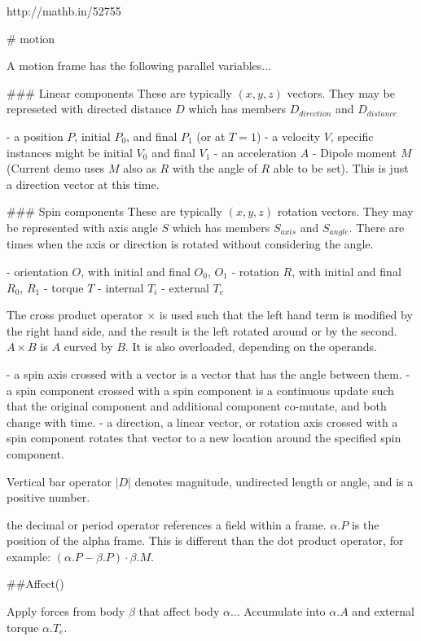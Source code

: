 
http://mathb.in/52755


# motion

A motion frame has the following parallel variables...

### Linear components
These are typically $(x,y,z)$ vectors.  They may be represeted with directed distance $D$ which has members $D_{direction}$ and $D_{distance}$

- a position $P$, initial $P_0$, and final $P_1$ (or at $T=1$)
- a velocity $V$, specific instances might be initial $V_0$ and final $V_1$
- an acceleration $A$
- Dipole moment $M$ (Current demo uses $M$ also as $R$ with the angle of $R$ able to be set).  This is just a direction vector at this time.
  
### Spin components 
These are typically $(x,y,z)$ rotation vectors.  They may be represented with axis angle $S$ which has members $S_{axis}$ and $S_{angle}$.  There are times when the axis or direction is rotated without considering the angle. 

- orientation $O$, with initial and final $O_0$, $O_1$
- rotation $R$, with initial and final $R_0$, $R_1$
- torque $T$
  - internal $T_i$
  - external $T_e$

The cross product operator $\times$ is used such that the left hand term is modified by the right hand side, and the result is the left rotated around or by the second.  $ A \times B $ is $A$ curved by $B$. It is also overloaded, depending on the operands.

- a spin axis crossed with a vector is a vector that has the angle between them.  
- a spin component crossed with a spin component is a continuous update such that the original component and additional component co-mutate, and both change with time.
- a direction, a linear vector, or rotation axis crossed with a spin component rotates that vector to a new location around the specified spin component.

Vertical bar operator $|D|$ denotes magnitude, undirected length or angle, and is a positive number.

the decimal or period operator references a field within a frame.  $\alpha.P$ is the position of the alpha frame. This is different than the dot product operator, for example: $(\alpha.P - \beta.P) \cdot \beta.M$.

##Affect()

Apply forces from body $\beta$ that affect body $\alpha$... Accumulate into $\alpha.A$ and external torque $\alpha.T_e$.

